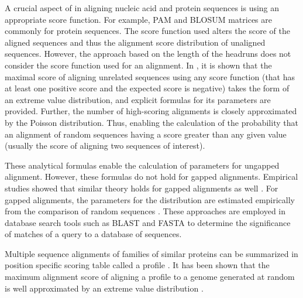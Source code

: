 A crucial aspect of in aligning nucleic acid and protein sequences is
using an appropriate score function. For example, PAM
\citep{dayhoff197822} and BLOSUM \citep{henikoff1992amino} matrices are
commonly for protein sequences.  The score function used alters the
score of the aligned sequences and thus the alignment score distribution
of unaligned sequences.
However, the approach based on the length of the headruns does not
consider the score function used for an alignment.
%
In \citep{karlin1990methods,karlin1990statistical}, it is shown that the
maximal score of aligning unrelated sequences using any score function
(that has at least one positive score and the expected score is
negative) takes the form of an extreme value distribution, and
explicit formulas for its parameters are provided. Further, the number
of high-scoring alignments is closely approximated by the Poisson
distribution.
%
Thus, enabling the calculation of the probability that an alignment of
random sequences having a score greater than any given value (usually
the score of aligning two sequences of interest).

These analytical formulas enable the calculation of parameters for
ungapped alignment. However, these formulas do not hold for gapped
alignments. Empirical studies showed that similar theory holds for gapped
alignments as well \citep{pearson1998empirical,smith1985statistical,
altschul199627}.
%
For gapped alignments, the parameters for the distribution are estimated
empirically from the comparison of random sequences
\citep{waterman1994sequence,waterman1994rapid,altschul199627}.
These approaches are employed in database search tools such as BLAST
\citep{altschul1990basic,altschul1997gapped} and FASTA
\citep{pearson1988improved,pearson1995comparison} to determine the
significance of matches of a query to a database of sequences.

Multiple sequence alignments of families of similar proteins can be
summarized in position specific scoring table called a profile
\citep{gribskov1987profile}.  It has been shown that the maximum
alignment score of aligning a profile to a genome generated at random is
well approximated by an extreme value distribution
\citep{goldstein1994approximations}.



